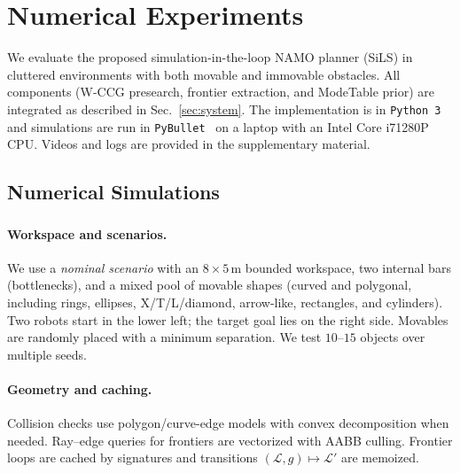 \section{Numerical Experiments}
\label{sec:experiments}
We evaluate the proposed simulation-in-the-loop NAMO planner (SiLS)
in cluttered environments with both movable and immovable obstacles.
All components (W-CCG presearch, frontier extraction, and ModeTable prior)
are integrated as described in Sec.~\ref{sec:system}.
The implementation is in \texttt{Python~3} and simulations are run in
\texttt{PyBullet}~\cite{coumans2019} on a laptop with an Intel
Core i7\textendash1280P CPU. Videos and logs are provided in the
supplementary material.

\subsection{Numerical Simulations}
\label{subsec:sim}

\subsubsection{}
\label{subsec:sim-setup}

\paragraph{Workspace and scenarios.}
We use a \emph{nominal scenario} with an $8{\times}5$\,m bounded
workspace, two internal bars (bottlenecks), and a mixed pool of movable
shapes (curved and polygonal, including rings, ellipses, X/T/L/diamond,
arrow-like, rectangles, and cylinders). Two robots start in the lower
left; the target goal lies on the right side. Movables are randomly
placed with a minimum separation. We test \(10\text{--}15\) objects
over multiple seeds.

\paragraph{Geometry and caching.}
Collision checks use polygon/curve-edge models with convex
decomposition when needed. Ray--edge queries for frontiers are
vectorized with AABB culling. Frontier loops are cached by signatures and
transitions $(\mathcal{L},g)\!\mapsto\!\mathcal{L}'$ are memoized.

